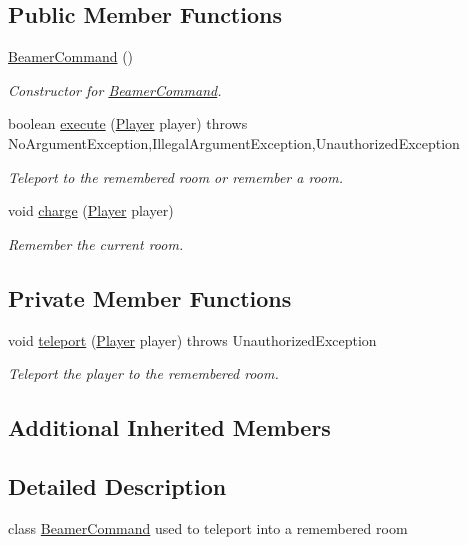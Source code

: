\subsection*{Public Member Functions}
\begin{DoxyCompactItemize}
\item 
\hyperlink{classBeamerCommand_accb1d84a69588f1b42fba96bf1b32de5}{Beamer\-Command} ()
\begin{DoxyCompactList}\small\item\em Constructor for \hyperlink{classBeamerCommand}{Beamer\-Command}. \end{DoxyCompactList}\item 
boolean \hyperlink{classBeamerCommand_ab28a7d743569841e463b2c0c65cf6eb1}{execute} (\hyperlink{classPlayer}{Player} player)  throws No\-Argument\-Exception,\-Illegal\-Argument\-Exception,\-Unauthorized\-Exception 
\begin{DoxyCompactList}\small\item\em Teleport to the remembered room or remember a room. \end{DoxyCompactList}\item 
void \hyperlink{classBeamerCommand_a130a572b2ec0532c92ea5033a098b1ac}{charge} (\hyperlink{classPlayer}{Player} player)
\begin{DoxyCompactList}\small\item\em Remember the current room. \end{DoxyCompactList}\end{DoxyCompactItemize}
\subsection*{Private Member Functions}
\begin{DoxyCompactItemize}
\item 
void \hyperlink{classBeamerCommand_a1f19366fb8b873959f72f38d49d5b178}{teleport} (\hyperlink{classPlayer}{Player} player)  throws Unauthorized\-Exception 
\begin{DoxyCompactList}\small\item\em Teleport the player to the remembered room. \end{DoxyCompactList}\end{DoxyCompactItemize}
\subsection*{Additional Inherited Members}


\subsection{Detailed Description}
class \hyperlink{classBeamerCommand}{Beamer\-Command} used to teleport into a remembered room 

